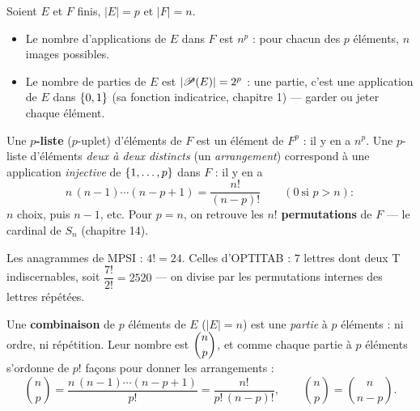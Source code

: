 
\begin{theoreme}
Soient $E$ et $F$ finis, $|E|=p$ et $|F|=n$.
\begin{itemize}[label={\color{otNavy}\textbullet},leftmargin=1.4em,itemsep=0.6mm,topsep=0.8mm]
  \item Le nombre d'applications de $E$ dans $F$ est
    $n^{p}$ : pour chacun des $p$ éléments, $n$ images possibles.
  \item Le nombre de parties de $E$ est
    $|\mathscr{P}(E)|=2^{p}$ : une partie, c'est une application de $E$ dans
    $\left\{0,1\right\}$ (sa fonction indicatrice, chapitre 1) — garder ou jeter
    chaque élément.
\end{itemize}
\end{theoreme}


\begin{definition}
Une \textbf{$p$-liste} ($p$-uplet) d'éléments de $F$ est un élément de
$F^{p}$ : il y en a $n^{p}$. Une $p$-liste d'éléments \emph{deux à deux
distincts} (un \emph{arrangement}) correspond à une application
\emph{injective} de $\left\{1,\dots,p\right\}$ dans $F$ : il y en a
\[
n\,(n-1)\cdots(n-p+1)=\frac{n!}{(n-p)!}
\qquad(0\ \text{si }p>n) :
\]
$n$ choix, puis $n-1$, etc. Pour $p=n$, on retrouve les $n!$
\textbf{permutations} de $F$ — le cardinal de $S_n$ (chapitre 14).
\end{definition}

\begin{exemple}[Anagrammes]
Les anagrammes de MPSI : $4!=24$. Celles d'OPTITAB : $7$ lettres dont deux
T indiscernables, soit $\dfrac{7!}{2!}=2520$ — on divise par les
permutations internes des lettres répétées.
\end{exemple}


\begin{definition}[Combinaisons]
Une \textbf{combinaison} de $p$ éléments de $E$ ($|E|=n$) est une
\emph{partie} à $p$ éléments : ni ordre, ni répétition. Leur nombre est
$\dbinom np$, et comme chaque partie à $p$ éléments s'ordonne de $p!$
façons pour donner les arrangements :
\[
\binom np=\frac{n\,(n-1)\cdots(n-p+1)}{p!}=\frac{n!}{p!\,(n-p)!},
\qquad
\binom np=\binom{n}{n-p}.
\]
\end{definition}

